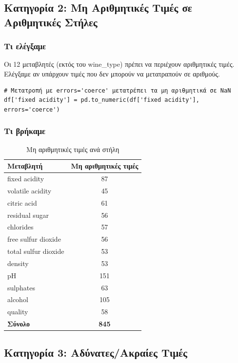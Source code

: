 \documentclass[12pt,a4paper]{article}
\begin{document}
\subsection{Κατηγορία 2: Μη Αριθμητικές Τιμές σε Αριθμητικές Στήλες}

\subsubsection{Τι ελέγξαμε}

Οι 12 μεταβλητές (εκτός του wine\_type) πρέπει να περιέχουν αριθμητικές τιμές. Ελέγξαμε αν υπάρχουν τιμές που δεν μπορούν να μετατραπούν σε αριθμούς.

\begin{lstlisting}[caption={Μετατροπή σε αριθμητικές τιμές}]
# Μετατροπή με errors='coerce' μετατρέπει τα μη αριθμητικά σε NaN
df['fixed acidity'] = pd.to_numeric(df['fixed acidity'], errors='coerce')
\end{lstlisting}

\subsubsection{Τι βρήκαμε}

\begin{table}[H]
\centering
\caption{Μη αριθμητικές τιμές ανά στήλη}
\label{tab:non_numeric}
\begin{tabular}{@{}lc@{}}
\toprule
\textbf{Μεταβλητή} & \textbf{Μη αριθμητικές τιμές} \\
\midrule
fixed acidity & 87 \\
volatile acidity & 45 \\
citric acid & 61 \\
residual sugar & 56 \\
chlorides & 57 \\
free sulfur dioxide & 56 \\
total sulfur dioxide & 53 \\
density & 53 \\
pH & 151 \\
sulphates & 63 \\
alcohol & 105 \\
quality & 58 \\
\midrule
\textbf{Σύνολο} & \textbf{845} \\
\bottomrule
\end{tabular}
\end{table}

\subsection{Κατηγορία 3: Αδύνατες/Ακραίες Τιμές}
\end{document}
